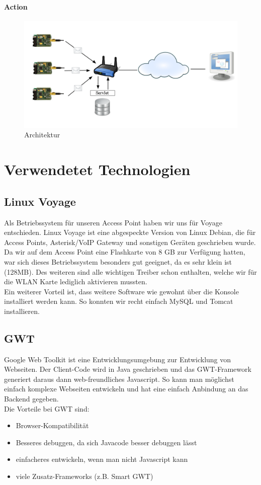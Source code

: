 \documentclass[12pt,a4paper,twoside]{article}
\newcommand{\labelSec}[1]{\label{sec:#1}}
\begin{document}
\paragraph{Action}




\begin{figure}[htbp]
   \centering
   \includegraphics[width=12cm]{fig/Architektur.png}
   \caption{Architektur}
   \label{architecture}
\end{figure}


\section{Verwendetet Technologien} \labelSec{abschnitt}
\subsection{Linux Voyage \cite{voyage}} 
Als Betriebssystem für unseren Access Point haben wir uns für Voyage entschieden. Linux Voyage ist eine abgespeckte Version von Linux Debian, die für Access Points, Asterisk/VoIP Gateway und sonstigen Geräten geschrieben wurde. Da wir auf dem Access Point eine Flashkarte von 8 GB zur Verfügung hatten, war sich dieses Betriebssystem besonders gut geeignet, da es sehr  klein ist (128MB). Des weiteren sind alle wichtigen Treiber schon enthalten, welche wir für die WLAN Karte lediglich aktivieren mussten. \\
Ein weiterer Vorteil ist, dass weitere Software wie gewohnt über die Konsole installiert werden kann. So konnten wir recht einfach MySQL und Tomcat installieren.

\subsection{GWT \cite{gwt}}
Google Web Toolkit ist eine Entwicklungsumgebung zur Entwicklung von Webseiten. Der Client-Code wird in Java geschrieben und das GWT-Framework generiert daraus dann web-freundliches Javascript. So kann man möglichst einfach komplexe Webseiten entwickeln und hat eine einfach Anbindung an das Backend gegeben. \\
Die Vorteile bei GWT sind:
\begin{itemize}
 \item Browser-Kompatibilität
 \item Besseres debuggen, da sich Javacode besser debuggen lässt
 \item einfacheres entwickeln, wenn man nicht Javascript kann
 \item viele Zusatz-Frameworks (z.B. Smart GWT)
\end{itemize}
\end{document}
